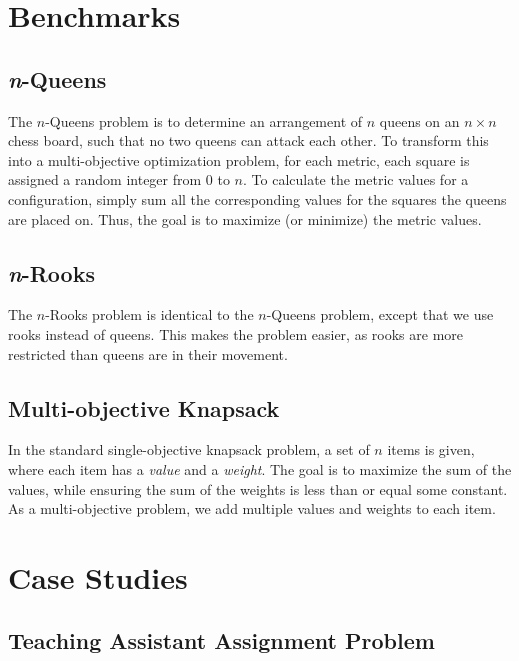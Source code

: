 \documentclass[11pt]{article}
\begin{document}
\section{Benchmarks}

\subsection{\textit{n}-Queens}

The $n$-Queens problem is to determine an arrangement of $n$
queens on an $n \times n$ chess board, such that no two queens can
attack each other. To transform this into a multi-objective
optimization problem, for each metric, each square is assigned a random
integer from $0$ to $n$. To calculate the metric values for a
configuration, simply sum all the corresponding values for the squares
the queens are placed on. Thus, the goal is to maximize (or minimize)
the metric values.

\subsection{\textit{n}-Rooks}

The $n$-Rooks problem is identical to the $n$-Queens problem, except
that we use rooks instead of queens. This makes the problem easier, as
rooks are more restricted than queens are in their movement.

\subsection{Multi-objective Knapsack}

In the standard single-objective knapsack problem, a set of $n$ items
is given, where each item has a \textit{value} and a \textit{weight}.
The goal is to maximize the sum of the values, while ensuring the sum
of the weights is less than or equal some constant. As a
multi-objective problem, we add multiple values and weights to each
item.

\section{Case Studies}

\subsection{Teaching Assistant Assignment Problem}
\end{document}
